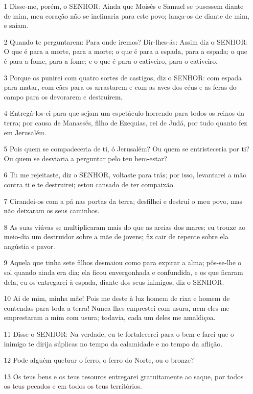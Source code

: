 \par 1 Disse-me, porém, o SENHOR: Ainda que Moisés e Samuel se pusessem diante de mim, meu coração não se inclinaria para este povo; lança-os de diante de mim, e saiam.
\par 2 Quando te perguntarem: Para onde iremos? Dir-lhes-ás: Assim diz o SENHOR: O que é para a morte, para a morte; o que é para a espada, para a espada; o que é para a fome, para a fome; e o que é para o cativeiro, para o cativeiro.
\par 3 Porque os punirei com quatro sortes de castigos, diz o SENHOR: com espada para matar, com cães para os arrastarem e com as aves dos céus e as feras do campo para os devorarem e destruírem.
\par 4 Entregá-los-ei para que sejam um espetáculo horrendo para todos os reinos da terra; por causa de Manassés, filho de Ezequias, rei de Judá, por tudo quanto fez em Jerusalém.
\par 5 Pois quem se compadeceria de ti, ó Jerusalém? Ou quem se entristeceria por ti? Ou quem se desviaria a perguntar pelo teu bem-estar?
\par 6 Tu me rejeitaste, diz o SENHOR, voltaste para trás; por isso, levantarei a mão contra ti e te destruirei; estou cansado de ter compaixão.
\par 7 Cirandei-os com a pá nas portas da terra; desfilhei e destruí o meu povo, mas não deixaram os seus caminhos.
\par 8 As suas viúvas se multiplicaram mais do que as areias dos mares; eu trouxe ao meio-dia um destruidor sobre a mãe de jovens; fiz cair de repente sobre ela angústia e pavor.
\par 9 Aquela que tinha sete filhos desmaiou como para expirar a alma; pôs-se-lhe o sol quando ainda era dia; ela ficou envergonhada e confundida, e os que ficaram dela, eu os entregarei à espada, diante dos seus inimigos, diz o SENHOR.
\par 10 Ai de mim, minha mãe! Pois me deste à luz homem de rixa e homem de contendas para toda a terra! Nunca lhes emprestei com usura, nem eles me emprestaram a mim com usura; todavia, cada um deles me amaldiçoa.
\par 11 Disse o SENHOR: Na verdade, eu te fortalecerei para o bem e farei que o inimigo te dirija súplicas no tempo da calamidade e no tempo da aflição.
\par 12 Pode alguém quebrar o ferro, o ferro do Norte, ou o bronze?
\par 13 Os teus bens e os teus tesouros entregarei gratuitamente ao saque, por todos os teus pecados e em todos os teus territórios.

